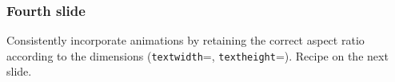\documentclass[./main.tex]{subfiles}
\begin{document}
\begin{frame}[label=slide04]
        \frametitle{Fourth slide}

        Consistently incorporate animations by retaining the correct aspect ratio according to the dimensions (\texttt{textwidth}=\the\textwidth, \texttt{textheight}=\the\textheight). Recipe on the next slide.
        \newline

        \centering
\end{frame}
\end{document}

